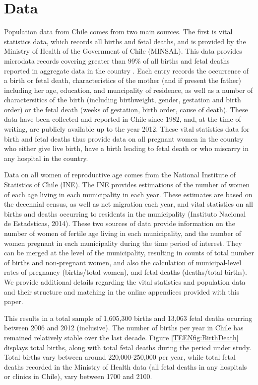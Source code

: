 \section{Data}
\label{TEENscn:Data}
Population data from Chile comes from two main sources. The first is vital 
statistics data, which records all births and fetal deaths, and is provided by 
the Ministry of Health of the Government of Chile (MINSAL). This data provides 
microdata records covering greater than 99\% of all births and fetal deaths 
reported in aggregate data in the country \citep{Bharadwajetal2013}. Each entry 
records the occurrence of a birth or fetal death, characteristics of the mother 
(and if present the father) including her age, education, and muncipality of 
residence, as well as a number of charactersitics of the birth (including 
birthweight, gender, gestation and birth order) or the fetal death (weeks of 
gestation, birth order, cause of death). These data have been collected and 
reported in Chile since 1982, and, at the time of writing, are publicly 
available up to the year 2012. These vital statistics data for birth and
fetal deaths thus provide data on all pregnant women in the country who either 
give live birth, have a birth leading to fetal death or who miscarry in any 
hospital in the country.

Data on all women of reproductive age comes from the National Institute of 
Statistics of Chile (INE). The INE provides estimations of the number of women 
of each age living in each municipality in each year. These estimates are based 
on the decennial census, as well as net migration each year, and vital 
statistics on all births and deaths occurring to residents in the municipality 
(Instituto Nacional de Estadsticas, 2014). These two sources of data provide 
information on the number of women of fertile age living in each municipality, 
and the number of women pregnant in each municipality during the time period of 
interest. They can be merged at the level of the municipality, resulting in
counts of total number of births and non-pregnant women, and also the calculation 
of municipal-level rates of pregnancy (births/total women), and fetal deaths 
(deaths/total births).  We provide additional details regarding the vital 
statistics and population data and their structure and matching in the online
appendices provided with this paper.

This results in a total sample of 1,605,300 births and 13,063 fetal deaths
ocurring between 2006 and 2012 (inclusive).  The number of births per year in 
Chile has remained relatively stable over the last decade.  
Figure \ref{TEENfig:BirthDeath} displays total births, along with total fetal 
deaths during the period under study.  Total births vary between around 
220,000-250,000 per year, while total fetal deaths recorded in the Ministry of 
Health data (all fetal deaths in any hospitals or clinics in Chile), vary between 
1700 and 2100.



